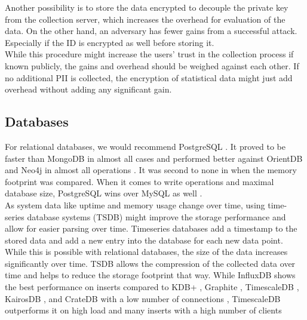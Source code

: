         Another possibility is to store the data encrypted to decouple the private key from the collection server, which increases the overhead for evaluation of the data. On the other hand, an adversary has fewer gains from a successful attack. Especially if the ID is encrypted as well before storing it.\\
        While this procedure might increase the users' trust in the collection process if known publicly, the gains and overhead should be weighed against each other. If no additional PII is collected, the encryption of statistical data might just add overhead without adding any significant gain.
        
\newpage
    \subsection{Databases} 
        \label{subsec:database}
        For relational databases, we would recommend PostgreSQL \cite{group_postgresql_2021}.
        It proved to be faster than MongoDB \cite{makris_mongodb_2020} in almost all cases and performed better against OrientDB and Neo4j in almost all operations \cite{noauthor_benchmark_2018}. It was second to none in  \cite{noauthor_benchmark_2018} when the memory footprint was compared.
        When it comes to write operations and maximal database size, PostgreSQL wins over MySQL as well \cite{noauthor_mysql_2021}.\\
        As system data like uptime and memory usage change over time, using time-series database systems (TSDB) might improve the storage performance and allow for easier parsing over time. Timeseries databases add a timestamp to the stored data and add a new entry into the database for each new data point. While this is possible with relational databases, the size of the data increases significantly over time. TSDB allows the compression of the collected data over time and helps to reduce the storage footprint that way. While InfluxDB shows the best performance on inserts compared to KDB+ \cite{noauthor_kdb_nodate}, Graphite \cite{noauthor_graphite_nodate}, TimescaleDB \cite{noauthor_time-series_nodate}, KairosDB \cite{noauthor_kairosdb_nodate}, and CrateDB \cite{noauthor_cratedb_nodate} with a low number of connections \cite{sychev_closed_2020}, TimescaleDB outperforms it on high load and many inserts with a high number of clients \cite{freedman_timescaledb_2020}\\
        
